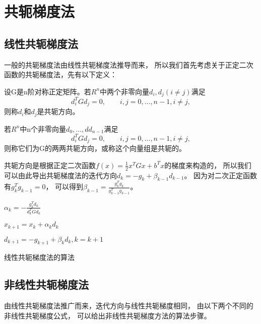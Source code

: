 \section{共轭梯度法}
\subsection{线性共轭梯度法}
    一般的共轭梯度法由线性共轭梯度法推导而来，
    所以我们首先考虑关于正定二次函数的共轭梯度法，先有以下定义：
    
    设G是n阶对称正定矩阵。若$R^n$中两个非零向量$d_i,d_j(i\not=j)$满足
    \begin{equation}
        d_i^TGd_j=0,\quad\quad i,j=0,...,n-1,i\not=j,
        \nonumber
    \end{equation}则称$d_i$和$d_j$是共轭方向。

    若$R^n$中n个非零向量$d_0,...,dd_{n-1}$满足
    \begin{equation}
        d_i^TGd_j=0,\quad\quad i,j=0,...,n-1,i\not=j,
        \nonumber
    \end{equation}
    则称它们为G的两两共轭方向，或称这个向量组是共轭的。

    共轭方向是根据正定二次函数$f(x)=\frac{1}{2}x^TGx+b^Tx$的梯度来构造的，
    所以我们可以由此导出共轭梯度法的迭代方向$d_k=-g_k+\beta_{k-1}d_{k-1}$。
    因为对二次正定函数有$g_k^Tg_{k-1}=0$，
    可以得到$\beta_{k-1}=\displaystyle\frac{g_k^Tg_k}{g_{k-1}^Tg_{k-1}}$。
    \begin{algorithm}
    
        \SetAlgoLined
    
         {
            $\alpha_k=-\displaystyle\frac{g_k^Td_k}{d_k^TGd_k}$
            
            $x_{k+1}=x_k+\alpha_kd_k$
            
            $d_{k+1}=-g_{k+1}+\beta_kd_k,k=k+1$
        }
        \caption{线性共轭梯度法的算法}
    \end{algorithm}
                     
\subsection{非线性共轭梯度法}
由线性共轭梯度法推广而来，迭代方向与线性共轭梯度相同，
由以下两个不同的非线性共轭梯度公式，
可以给出非线性共轭梯度方法的算法步骤。

